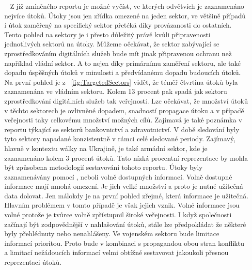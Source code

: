 ~
Z již zmíněného reportu\cite{Enisa_thread_landscape} je možné vyčíst, ve kterých odvětvích je zaznamenáno nejvíce útoků.
Útoky jsou jen zřídka omezené na jeden sektor, ve většině případů i útok zaměřený na specifický sektor přetéká díky provázanosti do ostatních.
Tento pohled na sektory je i přesto důležitý právě kvůli připravenosti jednotlivých sektorů na útoky.
Můžeme očekávat, že sektor zabývající se zprostředkováním digitálních služeb bude mít jinak připravenou ochranu než například vládní sektor.
A to nejen díky primárnímu zaměření sektoru, ale také dopadu úspěšných útoků v minulosti a předvídanému dopadu budoucích útoků.
Na první pohled je z ~\ref{fig:TargetedSectors} vidět, že téměř čtvrtina útoků byla zaznamenána ve vládním sektoru.
Kolem 13 procent pak spadá jak sektoru zprostředkování digitálních služeb tak veřejnosti.
Lze očekávat, že množství útoků v těchto sektorech je ovlivněné dopadem, snadností propagace útoku a v případě veřejnosti taky celkovému množství možných cílů.
Zajímavá je také poznámka v reportu týkající se sektorů bankovnictví a zdravotnictví.
V době sledování byly tyto sektory napadané konzistentně v rámci celé sledované periody.
Zajímavý, hlavně v kontextu wálky na Ukrajině, je také armádní sektor, kde je zaznamenáno kolem 3 procent útoků.
Tato nízká procentní reprezentace by mohla být způsobena metodologií sestavování tohoto reportu.
Útoky byly zaznamenávány pomocí , neboli volně dostupných informací\cite{moje_bakalarka}.
Volně dostupné informace mají mnohá omezení.
Je jich velké množství a proto je nutné užitečná data dolovat.
Jen málokdy je na první pohled zřejmé, která informace je užitečná.
Hlavním problémem v tomto případě je však jejich vznik.
Volné informace jsou volné protože je tvůrce volně zpřístupnil široké veřejnosti.
I když společnosti začínají být zodpovědnější v nahlašování útoků, stále lze předpokládat že některé byly přehlédnuty nebo nenahlášeny.
Ve vojenském sektoru bude limitace informací prioritou.
Proto bude v kombinaci s propagandou obou stran konfliktu a limitací nežádoucích informací velmi obtížné sestavovat jakoukoli přesnou reprezentaci útoků.

